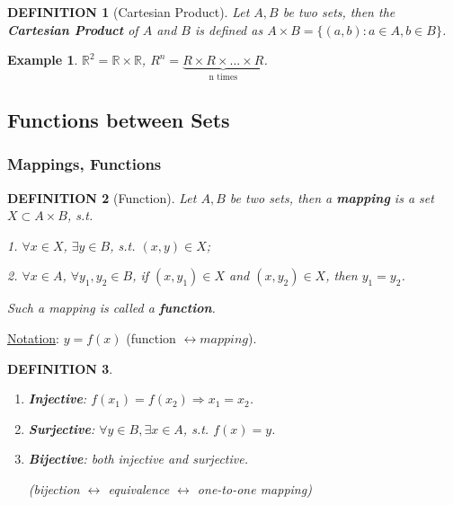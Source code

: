 \documentclass[12pt]{article}
\theoremstyle{blueplain}
\theoremstyle{bluedef}
\newtheorem{definition}{DEFINITION}[section]
\theoremstyle{blueremark}
\newtheorem{example}{Example}[section]
\newcommand{\R}{\mathbb{R}}
\numberwithin{equation}{section}
\begin{document}
\begin{definition}[Cartesian Product]

  Let $A, B$ be two sets, then the \textbf{Cartesian Product} of $A$ and $B$ is defined as $A \times B = \{(a, b): a \in A, b \in B\}$.
\end{definition}

\begin{example}
  $\R^2 = \R \times \R$, $R^n = \underbrace{R \times R \times \dots \times R}_{\text{n times}}$.
\end{example}

\clearpage

\subsection{Functions between Sets}

\subsubsection{Mappings, Functions}

\begin{definition}[Function]

  Let $A, B$ be two sets, then a \textbf{mapping} is a set $X \subset A \times B$, s.t.

  1. $\forall x \in X$, $\exists y \in B$, s.t. $(x, y) \in X$;

  2. $\forall x \in A$, $\forall y_1, y_2 \in B$, if $(x, y_1) \in X$ and $(x, y_2) \in X$, then $y_1 = y_2$.

  Such a mapping is called a \textbf{function}.
\end{definition}

\underline{Notation}: $y = f(x)$ (function $\leftrightarrow mapping$).

\begin{definition}
  \begin{enumerate}
    \item \textbf{Injective}: $f(x_1) = f(x_2) \Rightarrow x_1 = x_2$.
    \item \textbf{Surjective}: $\forall y \in B, \exists x \in A$, s.t. $f(x) = y$.
    \item \textbf{Bijective}: both injective and surjective.

          (bijection $\leftrightarrow$ equivalence $\leftrightarrow$ one-to-one mapping)
  \end{enumerate}
\end{definition}
\end{document}
